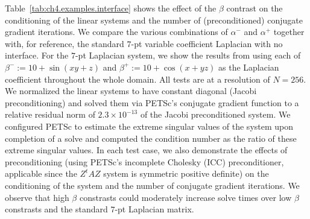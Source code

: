 Table~\ref{tab:ch4.examples.interface} shows the effect of the $\beta$ contrast on the conditioning of the linear systems and the number of (preconditioned) conjugate gradient iterations. We compare the various combinations of $\alpha^-$ and $\alpha^+$ together with, for reference, the standard $7$-pt variable coefficient Laplacian with no interface. For the $7$-pt Laplacian system, we show the results from using each of $\beta^- := 10 + \sin(xy + z)$ and $\beta^+ := 10 + \cos(x + yz)$ as the Laplacian coefficient throughout the whole domain. All tests are at a resolution of $N = 256$. We normalized the linear systems to have constant diagonal (Jacobi preconditioning) and solved them via PETSc's \cite{petsc-web-page,petsc-user-ref,petsc-efficient} conjugate gradient function to a relative residual norm of $2.3 \times 10^{-13}$ of the Jacobi preconditioned system. We configured PETSc to estimate the extreme singular values of the system upon completion of a solve and computed the condition number as the ratio of these extreme singular values. In each test case, we also demonstrate the effects of preconditioning (using PETSc's incomplete Cholesky (ICC) preconditioner, applicable since the $Z^tAZ$ system is symmetric positive definite) on the conditioning of the system and the number of conjugate gradient iterations. We observe that high $\beta$ constrasts could moderately increase solve times over low $\beta$ constrasts and the standard $7$-pt Laplacian matrix.


